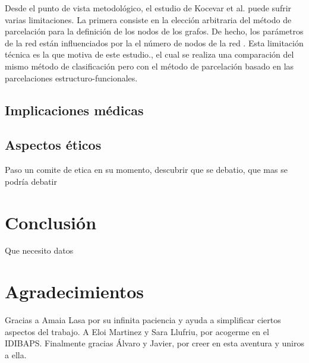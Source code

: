 \documentclass[fleqn,10pt]{UICArticle} %
\begin{document}
Desde el punto de vista metodológico, el estudio de Kocevar et al. \cite{Kocevar2016} puede sufrir varias limitaciones. La primera consiste en la elección arbitraria del método de parcelación para la definición de los nodos de los grafos. De hecho, los parámetros de la red están influenciados por la el número de nodos de la red \cite{Zalesky2010}. Esta limitación técnica es la que motiva  de este estudio., el cual se realiza una comparación del mismo método de clasificación pero con el método de parcelación basado en las parcelaciones estructuro-funcionales.


\subsection{Implicaciones médicas}

\subsection{Aspectos éticos}
Paso un comite de etica en su momento, descubrir que se debatio, que mas se podría debatir


\section{Conclusión}

Que necesito datos

\section*{Agradecimientos}
Gracias a Amaia Lasa por su infinita paciencia y ayuda a simplificar ciertos aspectos del trabajo. A Eloi Martinez y Sara Llufriu, por acogerme en el IDIBAPS. Finalmente gracias Álvaro y Javier, por creer en esta aventura y uniros a ella.






\end{document}

